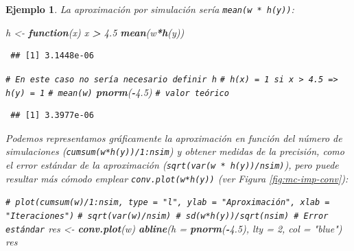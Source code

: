 \documentclass[
  spanish,
  10pt,
]{book}
\newenvironment{Shaded}{\begin{snugshade}}{\end{snugshade}}
\newcommand{\AttributeTok}[1]{\textcolor[rgb]{0.13,0.29,0.53}{#1}}
\newcommand{\CommentTok}[1]{\textcolor[rgb]{0.56,0.35,0.01}{\textit{#1}}}
\newcommand{\ControlFlowTok}[1]{\textcolor[rgb]{0.13,0.29,0.53}{\textbf{#1}}}
\newcommand{\DecValTok}[1]{\textcolor[rgb]{0.00,0.00,0.81}{#1}}
\newcommand{\FloatTok}[1]{\textcolor[rgb]{0.00,0.00,0.81}{#1}}
\newcommand{\FunctionTok}[1]{\textcolor[rgb]{0.13,0.29,0.53}{\textbf{#1}}}
\newcommand{\NormalTok}[1]{#1}
\newcommand{\OtherTok}[1]{\textcolor[rgb]{0.56,0.35,0.01}{#1}}
\newcommand{\SpecialCharTok}[1]{\textcolor[rgb]{0.81,0.36,0.00}{\textbf{#1}}}
\newcommand{\StringTok}[1]{\textcolor[rgb]{0.31,0.60,0.02}{#1}}
\theoremstyle{break}
\newtheorem{example}{Ejemplo}[chapter]
\theoremstyle{nonumberplain}
\renewcommand{\CommentTok}[1]{\textcolor[rgb]{0.41,0.41,0.41}{\texttt{#1}}}
\begin{document}
\begin{example}
La aproximación por simulación sería \texttt{mean(w\ *\ h(y))}:

\begin{Shaded}
\begin{Highlighting}[]
\NormalTok{h }\OtherTok{\textless{}{-}} \ControlFlowTok{function}\NormalTok{(x) x }\SpecialCharTok{\textgreater{}} \FloatTok{4.5} 
\FunctionTok{mean}\NormalTok{(w}\SpecialCharTok{*}\FunctionTok{h}\NormalTok{(y))}
\end{Highlighting}
\end{Shaded}

\begin{verbatim}
 ## [1] 3.1448e-06
\end{verbatim}

\begin{Shaded}
\begin{Highlighting}[]
\CommentTok{\# En este caso no sería necesario definir h}
\CommentTok{\# h(x) = 1 si x \textgreater{} 4.5 =\textgreater{} h(y) = 1}
\CommentTok{\# mean(w)}
\FunctionTok{pnorm}\NormalTok{(}\SpecialCharTok{{-}}\FloatTok{4.5}\NormalTok{)  }\CommentTok{\# valor teórico}
\end{Highlighting}
\end{Shaded}

\begin{verbatim}
 ## [1] 3.3977e-06
\end{verbatim}

Podemos representamos gráficamente la aproximación en función del número de simulaciones (\texttt{cumsum(w*h(y))/1:nsim}) y obtener medidas de la precisión, como el error estándar de la aproximación (\texttt{sqrt(var(w\ *\ h(y))/nsim)}), pero puede resultar más cómodo emplear \texttt{conv.plot(w*h(y))} (ver Figura \ref{fig:mc-imp-conv}):

\begin{Shaded}
\begin{Highlighting}[]
\CommentTok{\# plot(cumsum(w)/1:nsim, type = "l", ylab = "Aproximación", xlab = "Iteraciones")}
\CommentTok{\# sqrt(var(w)/nsim) \# sd(w*h(y))/sqrt(nsim) \# Error estándar}
\NormalTok{res }\OtherTok{\textless{}{-}} \FunctionTok{conv.plot}\NormalTok{(w)}
\FunctionTok{abline}\NormalTok{(}\AttributeTok{h =} \FunctionTok{pnorm}\NormalTok{(}\SpecialCharTok{{-}}\FloatTok{4.5}\NormalTok{), }\AttributeTok{lty =} \DecValTok{2}\NormalTok{, }\AttributeTok{col =} \StringTok{"blue"}\NormalTok{)}
\NormalTok{res}
\end{Highlighting}
\end{Shaded}


\end{example}
\end{document}

